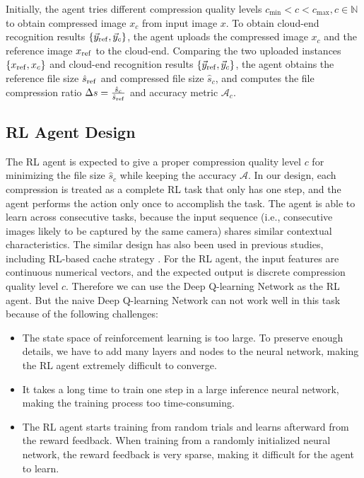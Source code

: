 Initially, the agent tries different compression quality levels $ c_{\min} < c < c_{\max}, c \in \mathbb{N} $ to obtain compressed image $ x_c $ from input image $ x $. To obtain cloud-end recognition results $ \{\vec{y}_{\rm ref}, \vec{y}_c\} $, the agent uploads the compressed image $ x_c $ and the reference image $ x_{\rm ref} $ to the cloud-end. Comparing the two uploaded instances $ \{x_{\rm ref}, x_c\} $ and cloud-end recognition results $ \{\vec{y}_{\rm ref}, \vec{y}_c\} $, the agent obtains the reference file size {\color{revise2}$ \hat{s}_{\rm ref} $} and compressed file size {\color{revise2}$ \hat{s}_c $}, and computes the file compression ratio {\color{revise2}$ \Delta s = \frac{\hat{s}_c}{\hat{s}_{\rm ref}} $} and accuracy metric $ \mathcal{A}_c $.

\subsection{RL Agent Design}
\label{RL Design}
The RL agent is expected to give a proper compression quality level $ c $ for minimizing the file size {\color{revise2}$ \hat{s}_c $} while keeping the accuracy $ \mathcal{A} $. {\color{revise2} In our design, each compression is treated as a complete RL task that only has one step, and the agent performs the action only once to accomplish the task. The agent is able to learn across consecutive tasks, because the input sequence (i.e., consecutive images likely to be captured by the same camera) shares similar contextual characteristics. The similar design has also been used in previous studies, including RL-based cache strategy \cite{wang2020intelligent_RL,zhong2018deep_RL,sadeghi2019deep_RL}.} For the RL agent, the input features are continuous numerical vectors, and the expected output is discrete compression quality level $ c $. Therefore we can use the Deep Q-learning Network as the RL agent. But the naive Deep Q-learning Network can not work well in this task because of the following challenges: %

\begin{itemize}
	\item The state space of reinforcement learning is too large. To preserve enough details, we have to add many layers and nodes to the neural network, making the RL agent extremely difficult to converge. 
	\item It takes a long time to train one step in a large inference neural network, making the training process too time-consuming.
	\item The RL agent starts training from random trials and learns afterward from the reward feedback. When training from a randomly initialized neural network, the reward feedback is very sparse, making it difficult for the agent to learn.
\end{itemize}

